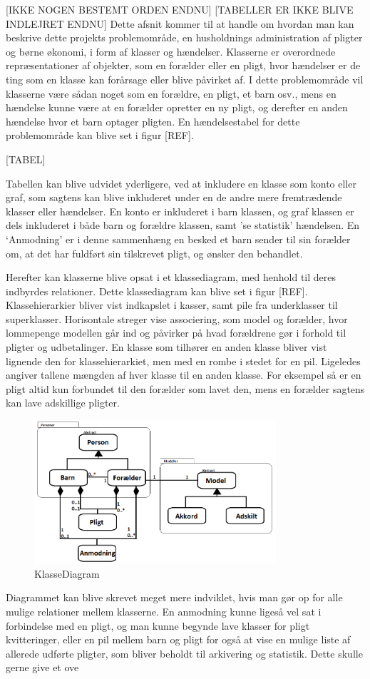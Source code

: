 [IKKE NOGEN BESTEMT ORDEN ENDNU]
[TABELLER ER IKKE BLIVE INDLEJRET ENDNU]
Dette afsnit kommer til at handle om hvordan man kan beskrive dette projekts problemområde, en husholdnings administration af pligter og børne økonomi, i form af klasser og hændelser. Klasserne er overordnede repræsentationer af objekter, som en forælder eller en pligt, hvor hændelser er de ting som en klasse kan forårsage eller blive påvirket af. I dette problemområde vil klasserne være sådan noget som en forældre, en pligt, et barn osv., mens en hændelse kunne være at en forælder opretter en ny pligt, og derefter en anden hændelse hvor et barn optager pligten. En hændelsestabel for dette problemområde kan blive set i figur [REF].

[TABEL]

Tabellen kan blive udvidet yderligere, ved at inkludere en klasse som konto eller graf, som sagtens kan blive inkluderet under en de andre mere fremtrædende klasser eller hændelser. En konto er inkluderet i barn klassen, og graf klassen er dels inkluderet i både barn og forældre klassen, samt ’se statistik’ hændelsen. En ‘Anmodning’ er i denne sammenhæng en besked et barn sender til sin forælder om, at det har fuldført sin tilskrevet pligt, og ønsker den behandlet.

Herefter kan klasserne blive opsat i et klassediagram, med henhold til deres indbyrdes relationer. Dette klassediagram kan blive set i figur [REF]. Klassehierarkier bliver vist indkapslet i kasser, samt pile fra underklasser til superklasser. Horisontale streger vise associering, som model og forælder, hvor lommepenge modellen går ind og påvirker på hvad forældrene gør i forhold til pligter og udbetalinger. En klasse som tilhører en anden klasse bliver vist lignende den for klassehierarkiet, men med en rombe i stedet for en pil. Ligeledes angiver tallene mængden af hver klasse til en anden klasse. For eksempel så er en pligt altid kun forbundet til den forælder som lavet den, mens en forælder sagtens kan lave adskillige pligter.

\begin{figure}[htb]
\centering
\includegraphics[width=0.8\textwidth]{Billeder/KlasseDiagram.png}
\caption{KlasseDiagram}
\label{KlasseDiagram}
\end{figure}

Diagrammet kan blive skrevet meget mere indviklet, hvis man gør op for alle mulige relationer mellem klasserne. En anmodning kunne ligeså vel sat i forbindelse med en pligt, og man kunne begynde lave klasser for pligt kvitteringer, eller en pil mellem barn og pligt for også at vise en mulige liste af allerede udførte pligter, som bliver beholdt til arkivering og statistik. Dette skulle gerne give et ove